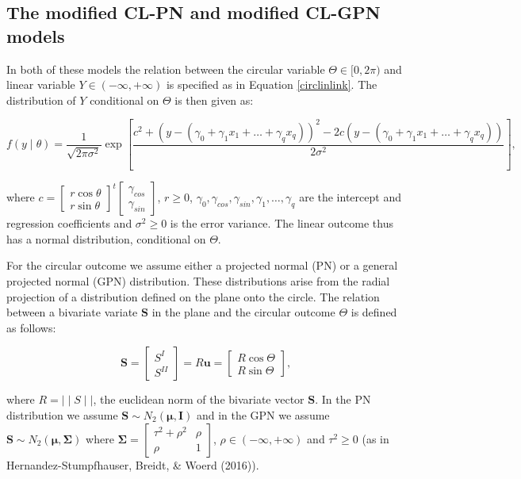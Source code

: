 \documentclass[11pt,]{article}
\begin{document}
\subsection{The modified CL-PN and modified CL-GPN  models}\label{CL-(G)PN}

In both of these models the relation between the circular variable
\(\Theta \in [0, 2\pi)\) and linear variable
\(Y \in (-\infty, + \infty)\) is specified as in Equation
\ref{circlinlink}. The distribution of \(Y\) conditional on \(\Theta\)
is then given as:

\begin{equation}\label{ycondtheta}
f(y \mid \theta) = \frac{1}{\sqrt{2\pi\sigma^2}}\exp\left[\frac{c^2 + (y - (\gamma_0 + \gamma_1x_1 + \dots + \gamma_qx_q))^{2} - 2c(y - (\gamma_0 + \gamma_1x_1 + \dots + \gamma_qx_q))}{2\sigma^2}\right],
\end{equation}

where
\(c = \begin{bmatrix} r \cos \theta \\ r\sin \theta \end{bmatrix}^t \begin{bmatrix} \gamma_{cos} \\ \gamma_{sin} \end{bmatrix}\),
\(r \geq 0\),
\(\gamma_0, \gamma_{cos}, \gamma_{sin}, \gamma_1, \dots, \gamma_q\) are
the intercept and regression coefficients and \(\sigma^2 \geq 0\) is the
error variance. The linear outcome thus has a normal distribution,
conditional on \(\Theta\).

For the circular outcome we assume either a projected normal (PN) or a
general projected normal (GPN) distribution. These distributions arise
from the radial projection of a distribution defined on the plane onto
the circle. The relation between a bivariate variate \(\boldsymbol{S}\)
in the plane and the circular outcome \(\Theta\) is defined as follows:

\begin{equation}\label{projection}
\boldsymbol{S} = \begin{bmatrix} S^{I} \\ S^{II} \end{bmatrix} = R\boldsymbol{u} = \begin{bmatrix} R \cos \Theta \\  R\sin \Theta \end{bmatrix},
\end{equation}

where \(R = \mid\mid S \mid\mid\), the euclidean norm of the bivariate
vector \(\boldsymbol{S}\). In the PN distribution we assume
\(\boldsymbol{S} \sim N_2(\boldsymbol{\mu}, \boldsymbol{I})\) and in the
GPN we assume
\(\boldsymbol{S} \sim N_2(\boldsymbol{\mu}, \boldsymbol{\Sigma})\) where
\(\boldsymbol{\Sigma} = \begin{bmatrix} \tau^2 + \rho^2 & \rho\\ \rho & 1 \end{bmatrix}\),
\(\rho \in (-\infty, +\infty)\) and \(\tau^2 \geq 0\) (as in
Hernandez-Stumpfhauser, Breidt, \& Woerd (2016)).
\end{document}
